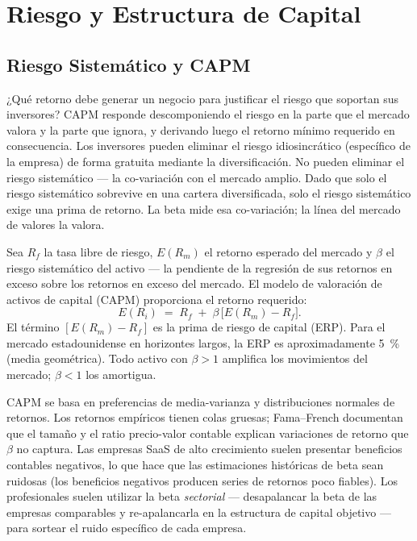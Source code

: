 \chapter{Riesgo y Estructura de Capital}\label{ch:risk-and-capital-structure}


\section{Riesgo Sistemático y CAPM}\label{sec:capm}

¿Qué retorno debe generar un negocio para justificar el riesgo que soportan sus inversores? CAPM responde
descomponiendo el riesgo en la parte que el mercado valora y la parte que ignora, y derivando luego el
retorno mínimo requerido en consecuencia. Los inversores pueden eliminar el riesgo idiosincrático
(específico de la empresa) de forma gratuita mediante la diversificación. No pueden eliminar el riesgo
sistemático --- la co-variación con el mercado amplio. Dado que solo el riesgo sistemático sobrevive en
una cartera diversificada, solo el riesgo sistemático exige una prima de retorno. La beta mide esa
co-variación; la línea del mercado de valores la valora.

Sea \(R_f\) la tasa libre de riesgo, \(E(R_m)\) el retorno esperado del mercado y \(\beta\)
el riesgo sistemático del activo --- la pendiente de la regresión de sus retornos en exceso sobre los
retornos en exceso del mercado. El modelo de valoración de activos de capital (CAPM) proporciona el
retorno requerido:
\begin{equation}\label{eq:capm}
  E(R_i) \;=\; R_f \;+\; \beta\,\bigl[E(R_m)-R_f\bigr].
\end{equation}
El término \([E(R_m)-R_f]\) es la prima de riesgo de capital (ERP). Para el mercado estadounidense en
horizontes largos, la ERP es aproximadamente \qty{5}{\percent} (media geométrica). Todo activo con
\(\beta>1\) amplifica los movimientos del mercado; \(\beta<1\) los amortigua.

CAPM se basa en preferencias de media-varianza y distribuciones normales de retornos. Los retornos
empíricos tienen colas gruesas; Fama--French documentan que el tamaño y el ratio precio-valor contable
explican variaciones de retorno que \(\beta\) no captura. Las empresas SaaS de alto crecimiento suelen
presentar beneficios contables negativos, lo que hace que las estimaciones históricas de beta sean
ruidosas (los beneficios negativos producen series de retornos poco fiables). Los profesionales suelen
utilizar la beta \emph{sectorial} --- desapalancar la beta de las empresas comparables y re-apalancarla
en la estructura de capital objetivo --- para sortear el ruido específico de cada empresa.

